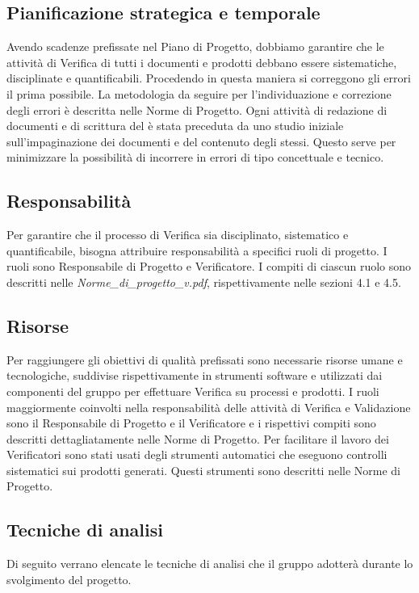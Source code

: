 \subsection{Pianificazione strategica e temporale} %
\label{2.5}
Avendo scadenze prefissate nel Piano di Progetto, dobbiamo garantire che le attività di Verifica di tutti i documenti e prodotti debbano essere sistematiche, disciplinate e quantificabili. Procedendo in questa maniera si correggono gli errori il prima possibile.
La metodologia da seguire per l'individuazione e correzione degli errori è descritta nelle Norme di Progetto.
Ogni attività di redazione di documenti e di scrittura del  è stata preceduta da uno studio iniziale sull'impaginazione dei documenti e del contenuto degli stessi. Questo serve per minimizzare la possibilità di incorrere in errori di tipo concettuale e tecnico.

\subsection{Responsabilità} %
\label{2.6}
Per garantire che il processo di Verifica sia disciplinato, sistematico e quantificabile, bisogna attribuire responsabilità a specifici ruoli di progetto. I ruoli sono Responsabile di Progetto e Verificatore. I compiti di ciascun ruolo sono descritti nelle \emph{Norme\_di\_progetto\_v\versioneNormeDiProgetto{}.pdf}, rispettivamente nelle sezioni 4.1 e 4.5.

\subsection{Risorse} %
\label{2.7}
Per raggiungere gli obiettivi di qualità prefissati sono necessarie risorse umane e tecnologiche, suddivise rispettivamente in strumenti software e  utilizzati dai componenti del gruppo per effettuare Verifica su processi e prodotti. I ruoli maggiormente coinvolti nella responsabilità delle attività di Verifica e Validazione sono il Responsabile di Progetto e il Verificatore e i rispettivi compiti sono descritti dettagliatamente nelle Norme di Progetto. Per facilitare il lavoro dei Verificatori sono stati usati degli strumenti automatici che eseguono controlli sistematici sui prodotti generati. Questi strumenti sono descritti nelle Norme di Progetto.

\subsection{Tecniche di analisi} %
Di seguito verrano elencate le tecniche di analisi che il gruppo adotterà durante lo svolgimento del progetto.


